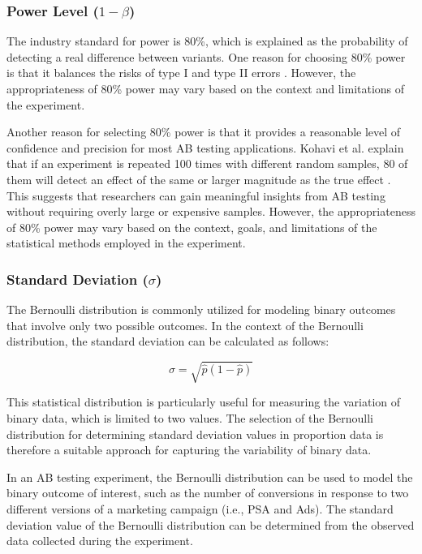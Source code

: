 \documentclass{article}
\begin{document}
\subsubsection*{Power Level ($1-\beta$)} 

The industry standard for power is 80\%, which is explained as the probability of detecting a real difference between variants. One reason for choosing 80\% power is that it balances the risks of type I and type II errors \cite{cohen_1988_statistical}. However, the appropriateness of 80\% power may vary based on the context and limitations of the experiment.

Another reason for selecting 80\% power is that it provides a reasonable level of confidence and precision for most AB testing applications. Kohavi et al. explain that if an experiment is repeated 100 times with different random samples, 80 of them will detect an effect of the same or larger magnitude as the true effect \cite{kohavi_2013_online}. This suggests that researchers can gain meaningful insights from AB testing without requiring overly large or expensive samples. However, the appropriateness of 80\% power may vary based on the context, goals, and limitations of the statistical methods employed in the experiment.

\subsubsection*{Standard Deviation ($\sigma$)} 

The Bernoulli distribution is commonly utilized for modeling binary outcomes that involve only two possible outcomes. In the context of the Bernoulli distribution, the standard deviation can be calculated as follows:

$$\sigma=\sqrt{\hat{p}(1-\hat{p})}$$

This statistical distribution is particularly useful for measuring the variation of binary data, which is limited to two values. The selection of the Bernoulli distribution for determining standard deviation values in proportion data is therefore a suitable approach for capturing the variability of binary data. 

In an AB testing experiment, the Bernoulli distribution can be used to model the binary outcome of interest, such as the number of conversions in response to two different versions of a marketing campaign (i.e., PSA and Ads). The standard deviation value of the Bernoulli distribution can be determined from the observed data collected during the experiment. 
\end{document}
